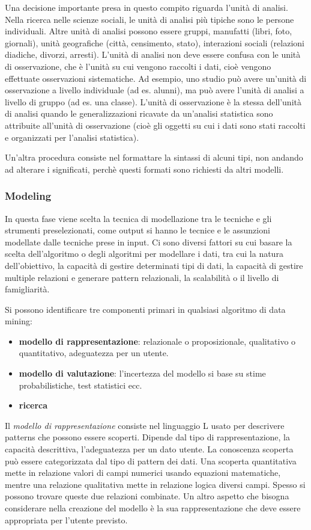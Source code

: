 \documentclass[a4paper]{extarticle}
\begin{document}
Una decisione importante presa in questo compito riguarda l'unità di analisi. Nella ricerca nelle scienze sociali, le unità di analisi più tipiche sono le persone individuali. Altre unità di analisi possono essere gruppi, manufatti (libri, foto, giornali), unità geografiche (città, censimento, stato), interazioni sociali (relazioni diadiche, divorzi, arresti). L'unità di analisi non deve essere confusa con le unità di osservazione, che è l'unità su cui vengono raccolti i dati, cioè vengono effettuate osservazioni sistematiche. Ad esempio, uno studio può avere un'unità di osservazione a livello individuale (ad es. alunni), ma può avere l'unità di analisi a livello di gruppo (ad es. una classe). L'unità di osservazione è la stessa dell'unità di analisi quando le generalizzazioni ricavate da un'analisi statistica sono attribuite all'unità di osservazione (cioè gli oggetti su cui i dati sono stati raccolti e organizzati per l'analisi statistica).

Un'altra procedura consiste nel formattare la sintassi di alcuni tipi, non andando ad alterare i significati, perchè questi formati sono richiesti da altri modelli.

\subsubsection{Modeling}

In questa fase viene scelta la tecnica di modellazione tra le tecniche e gli strumenti preselezionati, come output si hanno le tecnice e le assunzioni modellate dalle tecniche prese in input. Ci sono diversi fattori su cui basare la scelta dell'algoritmo o degli algoritmi per modellare i dati, tra cui la natura dell'obiettivo, la capacità di gestire determinati tipi di dati, la capacità di gestire multiple relazioni e generare pattern relazionali, la scalabilità o il livello di famigliarità. 

Si possono identificare tre componenti primari in qualsiasi algoritmo di data mining:
\begin{itemize}
\item \textbf{modello di rappresentazione}: relazionale o proposizionale, qualitativo o quantitativo, adeguatezza per un utente.
\item \textbf{modello di valutazione}: l'incertezza del modello si base su stime probabilistiche, test statistici ecc.
\item \textbf{ricerca}
\end{itemize}

Il \textit{modello di rappresentazione} consiste nel linguaggio L usato per descrivere patterns che possono essere scoperti. Dipende dal tipo di rappresentazione, la capacità descrittiva, l'adeguatezza per un dato utente. La conoscenza scoperta può essere categorizzata dal tipo di pattern dei dati. Una scoperta quantitativa mette in relazione valori di campi numerici usando equazioni matematiche, mentre una relazione qualitativa mette in relazione logica diversi campi. Spesso si possono trovare queste due relazioni combinate. Un altro aspetto che bisogna considerare nella creazione del modello è la sua rappresentazione che deve essere appropriata per l'utente previsto. 
\end{document}
